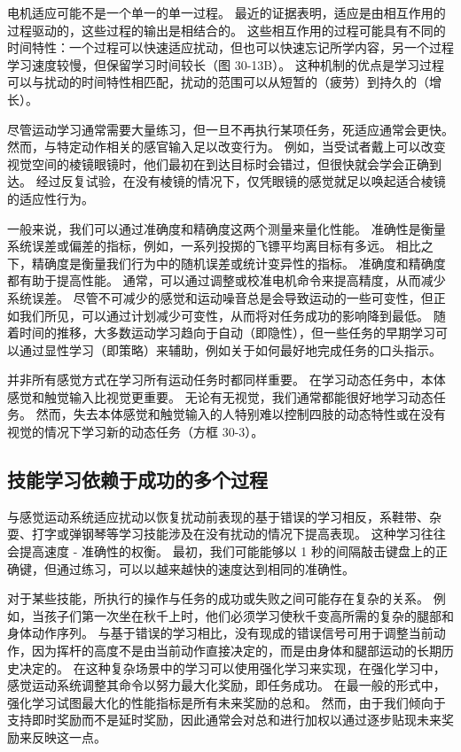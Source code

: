 电机适应可能不是一个单一的单一过程。 最近的证据表明，适应是由相互作用的过程驱动的，这些过程的输出是相结合的。 这些相互作用的过程可能具有不同的时间特性：一个过程可以快速适应扰动，但也可以快速忘记所学内容，另一个过程学习速度较慢，但保留学习时间较长（图 30-13B）。 这种机制的优点是学习过程可以与扰动的时间特性相匹配，扰动的范围可以从短暂的（疲劳）到持久的（增长）。

尽管运动学习通常需要大量练习，但一旦不再执行某项任务，死适应通常会更快。 然而，与特定动作相关的感官输入足以改变行为。 例如，当受试者戴上可以改变视觉空间的棱镜眼镜时，他们最初在到达目标时会错过，但很快就会学会正确到达。 经过反复试验，在没有棱镜的情况下，仅凭眼镜的感觉就足以唤起适合棱镜的适应性行为。

一般来说，我们可以通过准确度和精确度这两个测量来量化性能。 准确性是衡量系统误差或偏差的指标，例如，一系列投掷的飞镖平均离目标有多远。 相比之下，精确度是衡量我们行为中的随机误差或统计变异性的指标。 准确度和精确度都有助于提高性能。 通常，可以通过调整或校准电机命令来提高精度，从而减少系统误差。 尽管不可减少的感觉和运动噪音总是会导致运动的一些可变性，但正如我们所见，可以通过计划减少可变性，从而将对任务成功的影响降到最低。 随着时间的推移，大多数运动学习趋向于自动（即隐性），但一些任务的早期学习可以通过显性学习（即策略）来辅助，例如关于如何最好地完成任务的口头指示。

并非所有感觉方式在学习所有运动任务时都同样重要。 在学习动态任务中，本体感觉和触觉输入比视觉更重要。 无论有无视觉，我们通常都能很好地学习动态任务。 然而，失去本体感觉和触觉输入的人特别难以控制四肢的动态特性或在没有视觉的情况下学习新的动态任务（方框 30-3）。



\subsection{技能学习依赖于成功的多个过程}
与感觉运动系统适应扰动以恢复扰动前表现的基于错误的学习相反，系鞋带、杂耍、打字或弹钢琴等学习技能涉及在没有扰动的情况下提高表现。 这种学习往往会提高速度 - 准确性的权衡。 最初，我们可能能够以 1 秒的间隔敲击键盘上的正确键，但通过练习，可以以越来越快的速度达到相同的准确性。

对于某些技能，所执行的操作与任务的成功或失败之间可能存在复杂的关系。 例如，当孩子们第一次坐在秋千上时，他们必须学习使秋千变高所需的复杂的腿部和身体动作序列。 与基于错误的学习相比，没有现成的错误信号可用于调整当前动作，因为挥杆的高度不是由当前动作直接决定的，而是由身体和腿部运动的长期历史决定的。 在这种复杂场景中的学习可以使用强化学习来实现，在强化学习中，感觉运动系统调整其命令以努力最大化奖励，即任务成功。 在最一般的形式中，强化学习试图最大化的性能指标是所有未来奖励的总和。 然而，由于我们倾向于支持即时奖励而不是延时奖励，因此通常会对总和进行加权以通过逐步贴现未来奖励来反映这一点。

